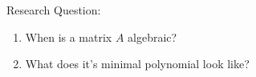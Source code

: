\documentclass[preview]{standalone}
\begin{document}
\begin{center}
Research Question: \begin{enumerate} \item When is a matrix $A$ algebraic? \item What does it’s minimal polynomial look like? \end{enumerate}
\end{center}
\end{document}
